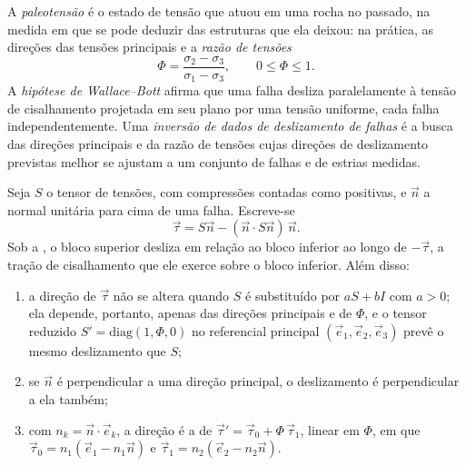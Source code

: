 \begin{definition}\label{def:b3:structural-analysis:palaeostress}
A \emph{paleotensão} é o estado de tensão que atuou em
uma rocha no passado, na medida em que se pode deduzir das estruturas que ela deixou:
na prática, as direções das tensões principais e a
\emph{razão de tensões}
\[
  \Phi = \frac{\sigma_2 - \sigma_3}{\sigma_1 - \sigma_3}, \qquad 0 \le \Phi
  \le 1 .
\]
A \emph{hipótese de Wallace--Bott} afirma
que uma falha desliza paralelamente à tensão de cisalhamento projetada em seu plano por uma
tensão uniforme, cada falha independentemente. Uma \emph{inversão de dados de
deslizamento de falhas} é a busca das direções principais
e da razão de tensões cujas direções de deslizamento previstas melhor se ajustam a um conjunto
de falhas e de estrias medidas.
\end{definition}

\begin{theorem}\label{thm:b3:structural-analysis:wallace-bott}
Seja $S$ o tensor de tensões, com compressões contadas como positivas, e $\vec n$ a
normal unitária para cima de uma falha. Escreve-se
\[
  \vec\tau = S\vec n - (\vec n\cdot S\vec n)\,\vec n .
\]
Sob a , o bloco superior desliza em relação ao
bloco inferior ao longo de $-\vec\tau$, a tração de cisalhamento que ele exerce sobre o
bloco inferior. Além disso:
\begin{enumerate}[label=(\alph*)]
  \item a direção de $\vec\tau$ não se altera quando $S$ é substituído por $aS +
        bI$ com $a > 0$; ela depende, portanto, apenas das direções principais
        e de $\Phi$, e o tensor reduzido $S' =
        \mathrm{diag}(1, \Phi, 0)$ no referencial principal $(\vec e_1, \vec
        e_2, \vec e_3)$ prevê o mesmo deslizamento que $S$;
  \item se $\vec n$ é perpendicular a uma direção principal, o deslizamento é
        perpendicular a ela também;
  \item com $n_k = \vec n\cdot\vec e_k$, a direção é a de $\vec\tau'
        = \vec\tau_0 + \Phi\,\vec\tau_1$, linear em $\Phi$, em que $\vec\tau_0
        = n_1(\vec e_1 - n_1\vec n)$ e $\vec\tau_1 = n_2(\vec e_2 - n_2\vec
        n)$.
\end{enumerate}
\end{theorem}

